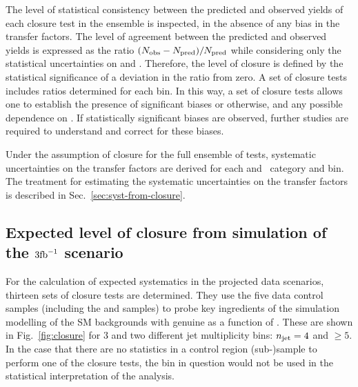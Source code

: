 The level of statistical consistency between the predicted and
observed yields of each closure test in the ensemble is inspected, in
the absence of any bias in the transfer factors. The level of
agreement between the predicted and observed yields is expressed as
the ratio $(\nobs - \npre)/\npre$ while considering only the
statistical uncertainties on \npre and \nobs. Therefore, the level of
closure is defined by the statistical significance of a deviation in
the ratio from zero. A set of closure tests includes ratios determined
for each \scalht bin. In this way, a set of closure tests allows one to
establish the presence of significant biases or otherwise, and any
possible dependence on \scalht. If statistically significant biases
are observed, further studies are required to understand and correct
for these biases.

Under the assumption of closure for the full ensemble of tests,
systematic uncertainties on the transfer factors are derived for each
\njet and \nb~category and \scalht bin. The treatment for
estimating the systematic uncertainties on the transfer factors is
described in Sec.~\ref{sec:syst-from-closure}.

\subsection{Expected level of closure from simulation of the $3\ifb$ scenario}
\label{sec:closure-mc-study}

For the calculation of expected systematics in the projected data scenarios, 
thirteen sets of closure tests are
determined. They use the five data control samples (including the \ej
and \eej samples) to
probe key ingredients of the simulation modelling of the SM
backgrounds with genuine \met as a function of \scalht. These are
shown in Fig.~\ref{fig:closure} for 3 \ifb %
and two different jet multiplicity bins: $\njet = 4$ and $\geq 5$. 
In the case that there are no statistics in a control region (sub-)sample
to perform one of the closure tests, the bin in question would not be 
used in the statistical interpretation of the analysis.

